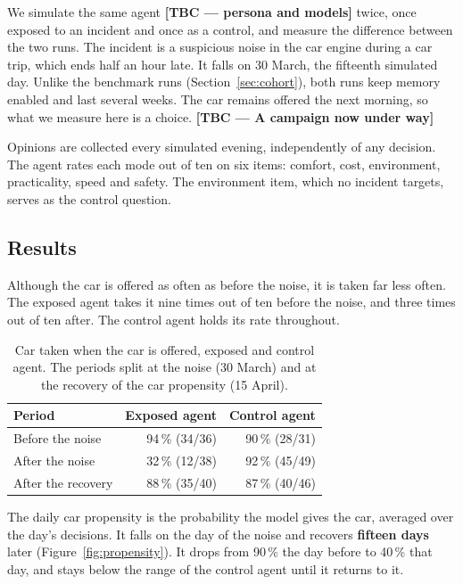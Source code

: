 We simulate the same agent \textbf{[TBC --- persona and models]} twice, once exposed to an
incident and once as a control, and measure the difference between the two runs. The
incident is a suspicious noise in the car engine during a car trip, which ends half an hour late. It falls on
30 March, the fifteenth simulated day. Unlike the benchmark runs
(Section~\ref{sec:cohort}), both runs keep memory enabled and last several weeks. The car
remains offered the next morning, so what we measure here is a choice.
\textbf{[TBC --- A campaign now under way]}

Opinions are collected every simulated evening, independently of any decision. The agent
rates each mode out of ten on six items: comfort, cost, environment, practicality, speed and
safety. The environment item, which no incident targets, serves as the control question.

\subsection{Results}
\label{sec:traced-results}

Although the car is offered as often as before the noise, it is taken far less often. The
exposed agent takes it nine times out of ten before the noise, and three times out of ten
after. The control agent holds its rate throughout.

\begin{table}[tbp]
  \caption{Car taken when the car is offered, exposed and control agent. The periods split
    at the noise (30 March) and at the recovery of the car propensity (15 April).}
  \label{tab:offered}
  \begin{tabular}{@{}lrr@{}}
    \toprule
    Period & Exposed agent & Control agent \\
    \midrule
    Before the noise & 94\,\% (34/36) & 90\,\% (28/31) \\
    After the noise  & 32\,\% (12/38) & 92\,\% (45/49) \\
    After the recovery & 88\,\% (35/40) & 87\,\% (40/46) \\
    \bottomrule
  \end{tabular}
\end{table}

The daily car propensity is the probability the model gives the car, averaged over the day's
decisions. It falls on the day of the noise and recovers \textbf{fifteen days} later
(Figure~\ref{fig:propensity}). It drops from 90\,\% the day before to 40\,\% that day, and
stays below the range of the control agent until it returns to it.

